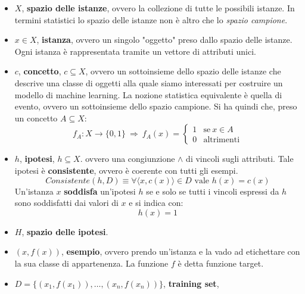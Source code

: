 \begin{itemize}
    \item $X$, \textbf{spazio delle istanze}, ovvero la collezione di tutte le
          possibili istanze. In termini statistici lo spazio delle istanze non è altro
          che lo \textit{spazio campione}.
    \item $x \in X$, \textbf{istanza}, ovvero un singolo "oggetto" preso dallo
          spazio delle istanze. Ogni istanza è rappresentata tramite un vettore di attributi unici.
    \item $c$, \textbf{concetto}, $c \subseteq X$, ovvero un sottoinsieme dello
          spazio delle istanze che descrive una classe di oggetti alla quale siamo interessati
          per costruire un modello di machine learning. La nozione statistica equivalente
          è quella di evento, ovvero un sottoinsieme dello spazio campione. Si ha quindi
          che, preso un concetto $A \subseteq X$:
          \begin{equation}
              f_A: X \to \{0, 1\} \ \Longrightarrow \ f_A(x) = \begin{cases} 1 &
              \text{se} \ x \in A \\ 0 & \text{altrimenti}\end{cases}
          \end{equation}
    \item $h$, \textbf{ipotesi}, $h \subseteq X$. ovvero una congiunzione $\land$
          di vincoli sugli attributi. Tale ipotesi è \textbf{consistente}, ovvero è
          coerente con tutti gli esempi.
          \begin{equation}
              Consistente(h, D) \equiv \forall \langle x, c(x) \rangle \in D
              \text{ vale } h(x) = c(x)
          \end{equation}
          Un'istanza $x$ \textbf{soddisfa} un'ipotesi $h$ se e solo se tutti i
          vincoli espressi da $h$ sono soddisfatti dai valori di $x$ e si indica con:
          \begin{equation}
              h(x) = 1
          \end{equation}
    \item $H$, \textbf{spazio delle ipotesi}.
    \item $(x, f(x))$, \textbf{esempio}, ovvero prendo un'istanza e la vado ad
          etichettare con la sua classe di appartenenza. La funzione $f$ è detta funzione
          target.
    \item $D = \{(x_1, f(x_1)), \dots, (x_n, f(x_n))\}$, \textbf{training set},

\end{itemize}
